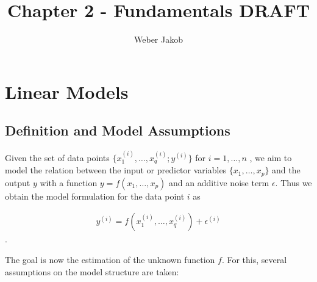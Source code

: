 \documentclass[10pt,a4paper]{article}
\title{Chapter 2 - Fundamentals DRAFT}
\author{Weber Jakob}
\begin{document}
\maketitle

\tableofcontents
\section{Linear Models} \label{sec:LinModel}
	
\subsection{Definition and Model Assumptions}  \label{subsec:LinModelDefAndAssump}

Given the set of data points $\{x^{(i)}_1, \dots, x^{(i)}_q; y^{(i)} \}$ for $i = 1, \dots, n$ , we aim to model the relation between the input or predictor variables $\{x_1, \dots, x_p\}$ and the output $y$ with a function $y = f(x_1, \dots, x_p)$ and an additive noise term $\epsilon$. Thus we obtain the model formulation for the data point $i$ as

\begin{align} \label{eq:lin_mod_single_data_point}
	y^{(i)} = f(x^{(i)}_{1}, \dots, x^{(i)}_{q}) + \epsilon^{(i)}
\end{align}.

The goal is now the estimation of the unknown function $f$. For this, several assumptions on the model structure are taken:
\end{document}
